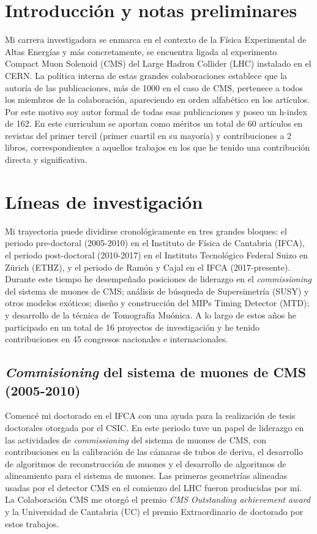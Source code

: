 \section{Introducción y notas preliminares}

Mi carrera investigadora se enmarca en el contexto de la Física Experimental de Altas Energías y más concretamente, se encuentra ligada al experimento Compact Muon Solenoid (CMS) del Large Hadron Collider (LHC) instalado en el CERN. La política interna de estas grandes colaboraciones establece que la autoría de las publicaciones, más de 1000 en el caso de CMS, pertenece a todos los miembros de la colaboración, apareciendo en orden alfabético en los artículos. Por este motivo soy autor formal de todas esas publicaciones y poseo un h-index de 162. En este curriculum se aportan como méritos un total de 60 artículos en revistas del primer tercil (primer cuartil en su mayoría) y contribuciones a 2 libros, correspondientes a aquellos trabajos en los que he tenido una contribución directa y significativa. 

\section{Líneas de investigación}

Mi trayectoria puede dividirse cronológicamente en tres grandes bloques: el periodo pre-doctoral (2005-2010) en el Instituto de Física de Cantabria (IFCA), el periodo post-doctoral (2010-2017) en el Instituto Tecnológico Federal Suizo en Zürich (ETHZ), y el periodo de Ramón y Cajal en el IFCA (2017-presente). Durante este tiempo he desempeñado posiciones de liderazgo en el \emph{commissioning} del sistema de muones de CMS; análisis de búsqueda de Supersimetría (SUSY) y otros modelos exóticos; diseño y construcción del MIPs Timing Detector (MTD); y desarrollo de la técnica de Tomografía Muónica. A lo largo de estos años he participado en un total de 16 proyectos de investigación y he tenido contribuciones en 45 congresos nacionales e internacionales.  


\subsection{\emph{Commisioning} del sistema de muones de CMS (2005-2010)}

Comencé mi doctorado en el IFCA con una ayuda para la realización de tesis doctorales otorgada por el CSIC. En este periodo tuve un papel de liderazgo en las actividades de \emph{commissioning} del sistema de muones de CMS, con contribuciones en la calibración de las cámaras de tubos de deriva, el desarrollo de algoritmos de reconstrucción de muones y el desarrollo de algoritmos de alineamiento para el sistema de muones. Las primeras geometrías alineadas usadas por el detector CMS en el comienzo del LHC fueron producidas por mí. La Colaboración CMS me otorgó el premio \emph{CMS Outstanding achievement award} y la Universidad de Cantabria (UC) el premio Extraordinario de doctorado por estos trabajos.


